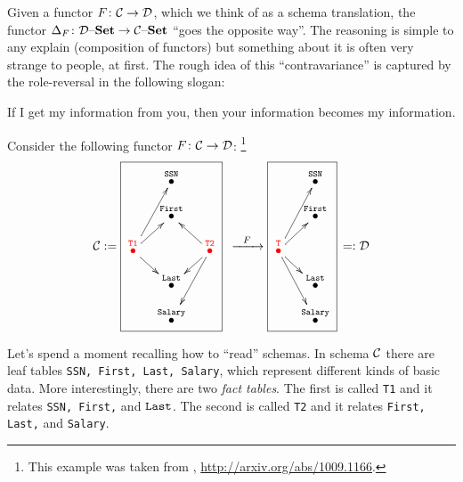 \documentclass[CT4S-EN-RU]{subfiles}
\begin{document}
\begin{blockRUS}
\end{blockRUS}

\begin{remarkENG}
Given a functor $F\colon\mathcal{C}\rightarrow\mathcal{D}$, which we think of as a schema translation, the functor $\Delta_F\colon\mathcal{D}{\text \textendash}{\bf Set}\rightarrow\mathcal{C}{\text \textendash}{\bf Set}$ “goes the opposite way”. The reasoning is simple to any explain (composition of functors) but something about it is often very strange to people, at first. The rough idea of this “contravariance” is captured by the role-reversal in the following slogan:
\end{remarkENG}

\begin{remarkRUS}
\end{remarkRUS}

\begin{sloganENG} 
If I get my information from you, then your information becomes my information. 
\end{sloganENG}

\begin{sloganRUS} 
\end{sloganRUS}

\begin{blockENG}
Consider the following functor $F\colon\mathcal{C}\rightarrow\mathcal{D}$: 
\footnote{This example was taken from \cite{Sp1}, \url{http://arxiv.org/abs/1009.1166}.}
\begin{align}\label{dia:translation}
\mcC:=\parbox{1.2in}{\fbox{\xymatrix@=10pt{&\LTO{SSN}\\&\LTO{First}\\\color{red}{\LTO{T1}}\ar[uur]\ar[ur]\ar[dr]&&\color{red}{\LTO{T2}}\ar[ul]\ar[dl]\ar[ddl]\\&\LTO{Last}\\&\LTO{Salary}}}}\Too{F}\parbox{.8in}{\fbox{\xymatrix@=10pt{&\LTO{SSN}\\&\LTO{First}\\\color{red}{\LTO{T}}\ar[uur]\ar[ur]\ar[dr]\ar[ddr]\\&\LTO{Last}\\&\LTO{Salary}}}}=:\mcD
\end{align}
\end{blockENG}

\begin{blockRUS}
\end{blockRUS}

\begin{blockENG}
Let's spend a moment recalling how to “read” schemas. In schema $\mathcal{C}$ there are leaf tables {\tt SSN, First, Last, Salary}, which represent different kinds of basic data. More interestingly, there are two {\em fact tables}. The first is called {\tt T1} and it relates {\tt SSN, First,} and ${\tt Last}$. The second is called {\tt T2} and it relates {\tt First, Last,} and {\tt Salary}.
\end{blockENG}
\end{document}

